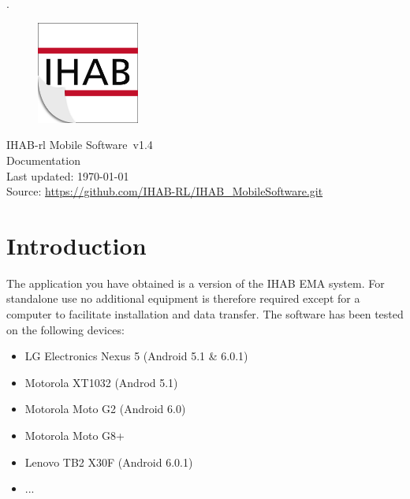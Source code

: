 \documentclass[11pt,a4paper,titlepage]{article}
\newcommand{\titleFull}{IHAB-rl Mobile Software}
\newcommand{\version}{v1.4}
\begin{document}
 
\pagestyle{empty}

\sffamily
\mdseries


\textcolor[rgb]{1,1,1}{.}
	\vspace{3cm}
	\begin{center}
	
	\begin{figure}[h]
		\centering
			\includegraphics[width=0.30\textwidth]{images/Logo_shadow.jpg}
		\label{fig:Fahrplan}
	\end{figure}
	\vspace{3cm}
	\Huge
	\titleFull \ \version
	\normalsize
	\\
	\vspace{1cm}
	Documentation\\
	\vspace{1cm}
	Last updated: \today\\
	\vspace{1cm}
	Source: \url{https://github.com/IHAB-RL/IHAB_MobileSoftware.git}
	\vfill
	\end{center}

%
\clearpage

\tableofcontents

\clearpage

\setcounter{page}{1}
\pagestyle{fancy}

\section{Introduction}

The application you have obtained is a version of the IHAB EMA system. For standalone use no additional equipment is therefore required except for a computer to facilitate installation and data transfer. The software has been tested on the following devices:
\begin{itemize}
	\item LG Electronics Nexus 5 (Android 5.1 \& 6.0.1)
	\item Motorola XT1032 (Androd 5.1)
	\item Motorola Moto G2  (Android 6.0)
	\item Motorola Moto G8+ 
	\item Lenovo TB2 X30F (Android 6.0.1)
	\item ...
\end{itemize}
\end{document}
